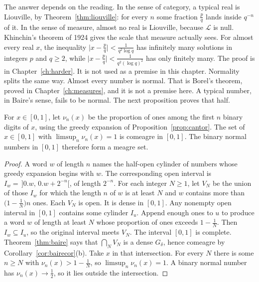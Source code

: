The answer depends on the reading. In the sense of category, a typical real is Liouville, by Theorem~\ref{thm:liouville}: for every $n$ some fraction $\frac pq$ lands inside $q^{-n}$ of it. In the sense of measure, almost no real is Liouville, because $\mathcal L$ is null. Khinchin's theorem of 1924 gives the scale that measure actually sees. For almost every real $x$, the inequality $\bigl|x-\frac pq\bigr|<\frac1{q^2\log q}$ has infinitely many solutions in integers $p$ and $q\ge2$, while $\bigl|x-\frac pq\bigr|<\frac1{q^2(\log q)^2}$ has only finitely many. The proof is in Chapter~\ref{ch:harder}. It is not used as a premise in this chapter.
Normality splits the same way. Almost every number is normal. That is Borel's theorem, proved in Chapter~\ref{ch:measures}, and it is not a premise here.
A typical number, in Baire's sense, fails to be normal. The next proposition proves that half.

\begin{proposition}\label{prop:nonnormal}
For $x\in[0,1]$, let $\nu_n(x)$ be the proportion of ones among the first $n$ binary digits of $x$, using the greedy expansion of Proposition~\ref{prop:cantor}. The set of $x\in[0,1]$ with $\limsup_n\nu_n(x)=1$ is comeagre in $[0,1]$. The binary normal numbers in $[0,1]$ therefore form a meagre set.
\end{proposition}
\begin{proof}
A word $w$ of length $n$ names the half-open cylinder of numbers whose greedy expansion begins with $w$. The corresponding open interval is $I_w=\,]0.w,\,0.w+2^{-n}[$, of length $2^{-n}$. For each integer $N\ge1$, let $V_N$ be the union of those $I_w$ for which the length $n$ of $w$ is at least $N$ and $w$ contains more than $\bigl(1-\frac1N\bigr)n$ ones. Each $V_N$ is open. It is dense in $[0,1]$. Any nonempty open interval in $[0,1]$ contains some cylinder $I_u$. Append enough ones to $u$ to produce a word $w$ of length at least $N$ whose proportion of ones exceeds $1-\frac1N$. Then $I_w\subseteq I_u$, so the original interval meets $V_N$. The interval $[0,1]$ is complete. Theorem~\ref{thm:baire} says that $\bigcap_N V_N$ is a dense $G_\delta$, hence comeagre by Corollary~\ref{cor:bairecor}(b). Take $x$ in that intersection. For every $N$ there is some $n\ge N$ with $\nu_n(x)>1-\frac1N$, so $\limsup_n\nu_n(x)=1$. A binary normal number has $\nu_n(x)\to\frac12$, so it lies outside the intersection.
\end{proof}

